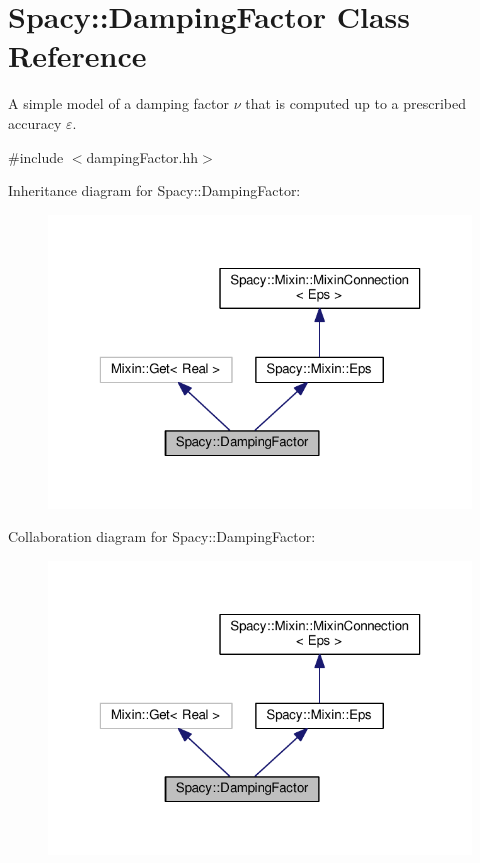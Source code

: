 \hypertarget{classSpacy_1_1DampingFactor}{\section{Spacy\-:\-:Damping\-Factor Class Reference}
\label{classSpacy_1_1DampingFactor}
}


A simple model of a damping factor $\nu$ that is computed up to a prescribed accuracy $\varepsilon$.  




{\ttfamily \#include $<$damping\-Factor.\-hh$>$}



Inheritance diagram for Spacy\-:\-:Damping\-Factor\-:
\nopagebreak
\begin{figure}[H]
\begin{center}
\leavevmode
\includegraphics[width=323pt]{classSpacy_1_1DampingFactor__inherit__graph}
\end{center}
\end{figure}


Collaboration diagram for Spacy\-:\-:Damping\-Factor\-:
\nopagebreak
\begin{figure}[H]
\begin{center}
\leavevmode
\includegraphics[width=323pt]{classSpacy_1_1DampingFactor__coll__graph}
\end{center}
\end{figure}

